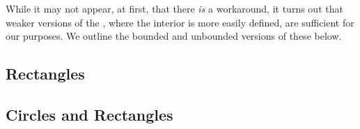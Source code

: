 While it may not appear, at first, that there \textit{is} a workaround, it turns out that weaker versions of the \CGT, where the interior is more easily defined, are sufficient for our purposes. We outline the bounded and unbounded versions of these below.


\subsection{Rectangles}

\subsection{Circles and Rectangles}